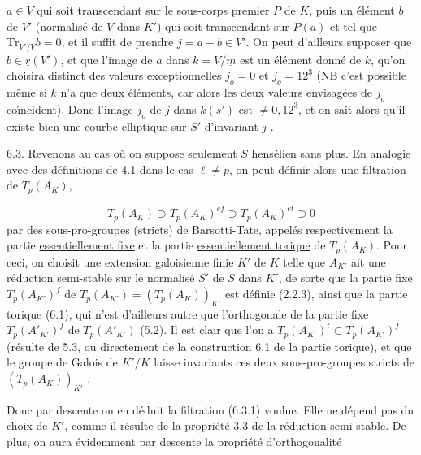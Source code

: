
$a \in V$ qui soit transcendant sur le sous-corps premier $P$ de $K$, puis un élément $b$ de $V'$ (normalisé de $V$ dans $K'$) qui soit transcendant sur $P(a)$ et tel que $\mathrm{Tr}_{V'/V} b = 0$, et il suffit de prendre $j = a + b \in V'$. On peut d'ailleurs supposer que $b \in \underline{r}(V')$, et que l'image de $a$ dans $k = V/\underline{m}$ est un élément donné de $k$, qu'on choisira distinct des valeurs exceptionnelles $j_o = 0$ et $j_o = 12^3$ (NB c'est possible même si $k$ n'a que deux éléments, car alors les deux valeurs envisagées de $j_o$ coïncident). Donc l'image $j_o$ de $j$ dans $k(s')$ est $\neq 0,12^3$, et on sait alors qu'il existe bien une courbe elliptique sur $S'$ d'invariant $j$ .

6.3. Revenons au cas où on suppose seulement $S$ hensélien sans plus. En analogie avec des définitions de 4.1 dans le cas $\ell \neq p$, on peut définir alors une filtration de $T_p(A_K)$,

\begin{equation}\tag{6.3.1}
T_p(A_K) \supset T_p(A_K)^{ef} \supset T_p(A_K)^{et} \supset 0
\end{equation}
par des sous-pro-groupes (stricts) de Barsotti-Tate, appelés respectivement la partie \underline{essentiellement fixe} et la partie \underline{essentiellement torique} de $T_p(A_K)$. Pour ceci, on choisit une extension galoisienne finie $K'$ de $K$ telle que $A_{K'}$ ait une réduction semi-stable sur le normalisé $S'$ de $S$ dans $K'$, de sorte que la partie fixe $T_p(A_{K'})^f$ de $T_p(A_{K'})=(T_p(A_K))_{K'}$ est définie (2.2.3), ainsi que la partie torique (6.1), qui n'est d'ailleurs autre que l'orthogonale de la partie fixe $T_p(A'_{K'})^f$ de $T_p(A'_{K'})$ (5.2). Il est clair que l'on a $T_p(A_{K'})^t \subset T_p(A_{K'})^f$ (résulte de 5.3, ou directement de la construction 6.1 de la partie torique), et que le groupe de Galois de $K'/K$ laisse invariants ces deux sous-pro-groupes stricts de $(T_p(A_K))_{K'}$ .



Donc par descente on en déduit la filtration (6.3.1) voulue. Elle ne dépend pas du choix de $K'$, comme il résulte de la propriété 3.3 de la réduction semi-stable. De plus, on aura évidemment par descente la propriété d'orthogonalité

